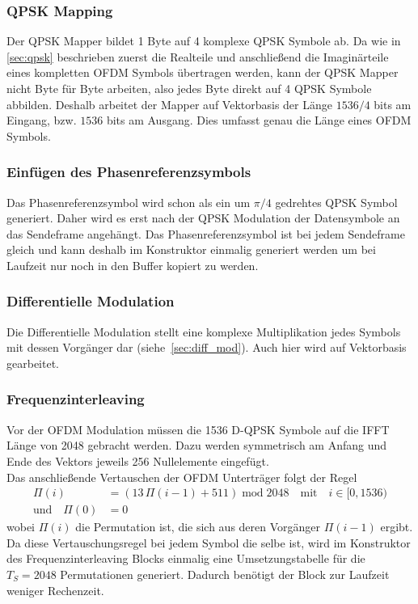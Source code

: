 \subsubsection{QPSK Mapping}
Der QPSK Mapper bildet 1 Byte auf 4 komplexe QPSK Symbole ab. Da wie in \ref{sec:qpsk} beschrieben zuerst die Realteile und anschließend die Imaginärteile eines kompletten OFDM Symbols übertragen werden, kann der QPSK Mapper nicht Byte für Byte arbeiten, also jedes Byte direkt auf 4 QPSK Symbole abbilden. Deshalb arbeitet der Mapper auf Vektorbasis der Länge $1536/4$ bits am Eingang, bzw. $1536$ bits am Ausgang. Dies umfasst genau die Länge eines OFDM Symbols.

\subsubsection{Einfügen des Phasenreferenzsymbols}
Das Phasenreferenzsymbol wird schon als ein um $\pi/4$ gedrehtes QPSK Symbol generiert. Daher wird es erst nach der QPSK Modulation der Datensymbole an das Sendeframe angehängt. Das Phasenreferenzsymbol ist bei jedem Sendeframe gleich und kann deshalb im Konstruktor einmalig generiert werden um bei Laufzeit nur noch in den Buffer kopiert zu werden.

\subsubsection{Differentielle Modulation}
Die Differentielle Modulation stellt eine komplexe Multiplikation jedes Symbols mit dessen Vorgänger dar (siehe~\ref{sec:diff_mod}). Auch hier wird auf Vektorbasis gearbeitet.

\subsubsection{Frequenzinterleaving}
Vor der OFDM Modulation müssen die 1536 D-QPSK Symbole auf die IFFT Länge von 2048 gebracht werden. Dazu werden symmetrisch am Anfang und Ende des Vektors jeweils 256 Nullelemente eingefügt.\\
Das anschließende Vertauschen der OFDM Unterträger folgt der Regel
\begin{equation}
\begin{aligned}
\Pi(i) &= (13\, \Pi(i-1) + 511)\; \text{mod}\; 2048 \quad \text{mit} \quad i \in [0,1536)\\
\text{und} \quad \Pi (0) &= 0
\end{aligned}
\end{equation}
wobei $\Pi(i)$ die Permutation ist, die sich aus deren Vorgänger $\Pi(i-1)$ ergibt. Da diese Vertauschungsregel bei jedem Symbol die selbe ist, wird im Konstruktor des Frequenzinterleaving Blocks einmalig eine Umsetzungstabelle für die $T_S=2048$ Permutationen generiert. Dadurch benötigt der Block zur Laufzeit weniger Rechenzeit.

